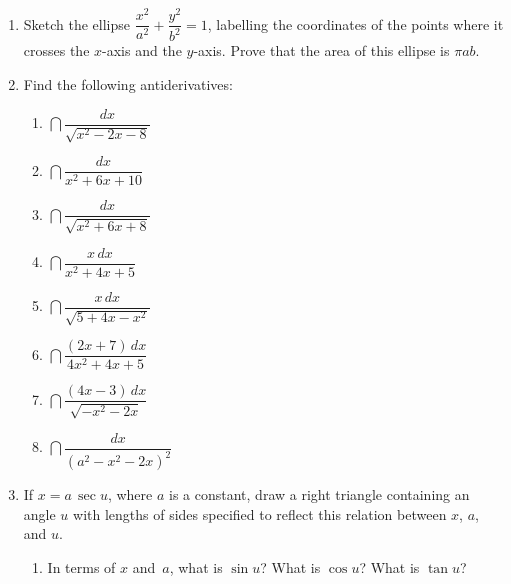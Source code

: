 \begin{enumerate}
\begin{enumerate}
  \item $\dint_1^2 \sqrt{x^2-1}\,dx$


  \item $\dint_0^{\pi/3} x\,\sec^2{x}\,dx$

  \item $\dint_0^1 \dfrac{dx}{(2-x^2)^{3/2}}$


  \item $\dint_0^\infty \dfrac{dx}{9+x^2}$


  \item $\dint_a^{2a} x^3\sqrt{x^2-a^2}\,dx$
\mbox{}


\end{enumerate}
\item Sketch the ellipse $\dfrac{x^2}{a^2}+ \dfrac{y^2}{b^2} = 1$,
labelling the coordinates of the points where it crosses the $x$-axis
and the $y$-axis.  Prove that the area of this ellipse is $\pi ab$.


\item Find the following antiderivatives:



  \begin{enumerate}
  \item $\dint \dfrac{dx}{\sqrt{x^2-2x-8}}$


  \item $\dint \dfrac{dx}{x^2+6x+10}$


  \item $\dint \dfrac{dx}{\sqrt{x^2+6x+8}}$


  \item $\dint \dfrac{x\,dx}{x^2+4x+5}$

  \item $\dint \dfrac{x\,dx}{\sqrt{5+4x-x^2}}$


  \item $\dint \dfrac{(2x+7)\,dx}{4x^2+4x+5}$


  \item $\dint \dfrac{(4x-3)\,dx}{\sqrt{-x^2-2x}}$


  \item $\dint \dfrac{dx}{(a^2-x^2-2x)^2}$
\mbox{}


\end{enumerate}
\item If $x= a\,\sec{u}$, where $a$ is a constant, draw a right
triangle containing an angle $u$ with lengths of sides specified to
reflect this relation between $x$, $a$, and $u$.

  \begin{enumerate}
  \item In terms of $x$ and~$a$, what is $\sin{u}$?  What is $\cos{u}$?
What is $\tan{u}$?



\end{enumerate}
\end{enumerate}
